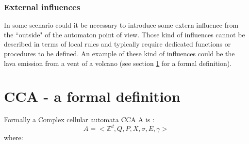 \subsubsection{External influences}
In some scenario could it be necessary to introduce some extern influence
from the ``outside" of the automaton point of view. Those kind of influences
cannot be described in terms of local rules and typically require dedicated
functions or procedures to be defined. An example of these kind of influences
could be the lava emission from a vent of a volcano (see section \ref{mcaFormal}
for a formal definition).

\section{CCA - a formal definition}\label{mcaFormal}
Formally a Complex cellular automata CCA A is :
\[
A=<\mathbb{Z}^d,Q,P,X,\sigma,E,\gamma>
\]
where:
